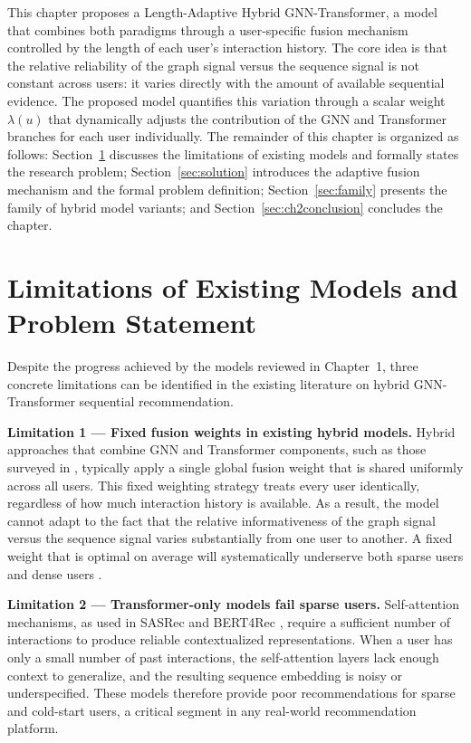 \documentclass[12pt,a4paper]{report}
\begin{document}
This chapter proposes a Length-Adaptive Hybrid GNN-Transformer, a model that
combines both paradigms through a user-specific fusion mechanism controlled by
the length of each user's interaction history. The core idea is that the
relative reliability of the graph signal versus the sequence signal is not
constant across users: it varies directly with the amount of available
sequential evidence. The proposed model quantifies this variation through a
scalar weight \(\lambda(u)\) that dynamically adjusts the contribution of the
GNN and Transformer branches for each user individually. The remainder of this
chapter is organized as follows: Section~\ref{sec:limitations} discusses the
limitations of existing models and formally states the research problem;
Section~\ref{sec:solution} introduces the adaptive fusion mechanism and the
formal problem definition; Section~\ref{sec:family} presents the family of
hybrid model variants; and Section~\ref{sec:ch2conclusion} concludes the
chapter.


\section{Limitations of Existing Models and Problem Statement}
\label{sec:limitations}

Despite the progress achieved by the models reviewed in Chapter~1, three
concrete limitations can be identified in the existing literature on hybrid
GNN-Transformer sequential recommendation.

\textbf{Limitation 1 --- Fixed fusion weights in existing hybrid models.}
Hybrid approaches that combine GNN and Transformer components, such as those
surveyed in \citep{wu2020gnnsurvey}, typically apply a single global fusion
weight that is shared uniformly across all users. This fixed weighting strategy
treats every user identically, regardless of how much interaction history is
available. As a result, the model cannot adapt to the fact that the relative
informativeness of the graph signal versus the sequence signal varies
substantially from one user to another. A fixed weight that is optimal on
average will systematically underserve both sparse users and dense users
\citep{pan2024survey}.

\textbf{Limitation 2 --- Transformer-only models fail sparse users.}
Self-attention mechanisms, as used in SASRec \citep{kang2018sasrec} and
BERT4Rec \citep{sun2019bert4rec}, require a sufficient number of interactions
to produce reliable contextualized representations. When a user has only a
small number of past interactions, the self-attention layers lack enough context
to generalize, and the resulting sequence embedding is noisy or
underspecified. These models therefore provide poor recommendations for sparse
and cold-start users, a critical segment in any real-world recommendation
platform.
\end{document}
